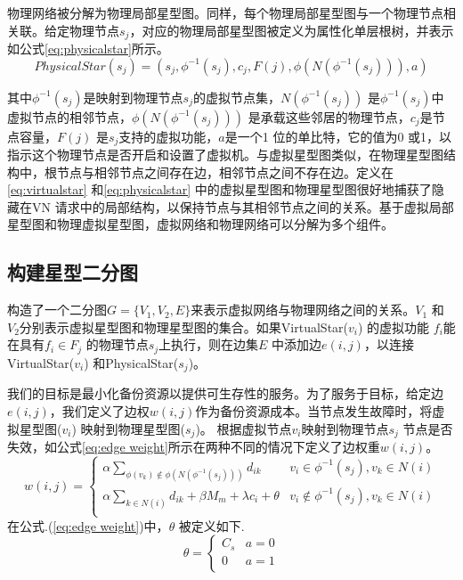 物理网络被分解为物理局部星型图。同样，每个物理局部星型图与一个物理节点相关联。给定物理节点$s_j$，对应的物理局部星型图被定义为属性化单层根树，并表示如公式\ref{eq:physicalstar}所示。
\begin{equation}
PhysicalStar(s_j)=(s_j, \phi^{-1}( s_j), c_j, F(j), \phi(N(\phi^{-1}( s_j))), a)
\label{eq:physicalstar}
\end{equation}

其中$\phi^{-1}( s_j)$是映射到物理节点$s_j$的虚拟节点集，$N(\phi^{-1}( s_j))$ 是$\phi^{-1}( s_j)$中虚拟节点的相邻节点，$\phi(N(\phi^{-1}( s_j)))$ 是承载这些邻居的物理节点，$c_j$是节点容量，$F(j)$ 是$s_j$支持的虚拟功能，$a$是一个1 位的单比特，它的值为0 或1，以指示这个物理节点是否开启和设置了虚拟机。与虚拟星型图类似，在物理星型图结构中，根节点与相邻节点之间存在边，相邻节点之间不存在边。定义在\ref{eq:virtualstar} 和\ref{eq:physicalstar} 中的虚拟星型图和物理星型图很好地捕获了隐藏在VN 请求中的局部结构，以保持节点与其相邻节点之间的关系。基于虚拟局部星型图和物理虚拟星型图，虚拟网络和物理网络可以分解为多个组件。

\subsection{构建星型二分图}
构造了一个二分图$G=\{V_1,V_2,E\}$来表示虚拟网络与物理网络之间的关系。$V_1$ 和$V_2$分别表示虚拟星型图和物理星型图的集合。如果VirtualStar($v_i$) 的虚拟功能 $f_i$能在具有${f_i} \in {F_j}$ 的物理节点$s_j$上执行，则在边集$E$ 中添加边$e(i,j)$，以连接VirtualStar($v_i$) 和PhysicalStar($s_j$)。

我们的目标是最小化备份资源以提供可生存性的服务。为了服务于目标，给定边$e(i,j)$，我们定义了边权$w(i,j)$作为备份资源成本。当节点发生故障时，将虚拟星型图($v_i$) 映射到物理星型图($s_j$)。 根据虚拟节点$v_i$映射到物理节点$s_j$ 节点是否失效，如公式\ref{eq:edge weight}所示在两种不同的情况下定义了边权重$w(i,j)$。
\begin{equation}
w(i,j) = \left\{ {\begin{array}{*{20}{c}}
   { \alpha \sum\limits_{\phi ({v_k}) \notin \phi (N({\phi ^{ - 1}}({s_j})))} {{d_{ik}}} } & {{v_i} \in {\phi ^{ - 1}}({s_j}),v_k \in N(i)}  \\
   {\alpha \sum\limits_{k \in N(i)} {{d_{ik}}}  + \beta {M_m} + \lambda {c_i} + \theta } & {{v_i} \notin {\phi ^{ - 1}}({s_j}),v_k \in N(i)}  \\
\end{array}} \right.
\label{eq:edge weight}
\end{equation}
在公式.(\ref{eq:edge weight})中，$\theta$ 被定义如下.
\begin{equation}
\theta  = \left\{ {\begin{array}{*{20}{c}}
   {{C_s}} & {a = 0}  \\
   0 & {a = 1}  \\
\end{array}} \right.
\end{equation}

